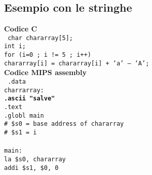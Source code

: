 \documentclass[../main.tex]{subfiles}
\begin{document}
\subsection*{Esempio con le stringhe}
\textbf{Codice C} \\
\texttt{
    char chararray[5]; \\
    int i; \\
    for (i=0 ; i != 5 ; i++) \\
    \hspace*{0cm} \hspace*{0cm} \hspace*{0cm} \hspace*{0cm} chararray[i] = chararray[i] + ‘a’ – ‘A’; \\[3mm]
}
\textbf{Codice MIPS assembly} \\
\texttt{
    .data \\
    charrarray: \\
    \hspace*{0cm} \hspace*{0cm} \hspace*{0cm} \hspace*{0cm} \textbf{.ascii "salve"} \\
    \hspace*{0cm} \hspace*{0cm} \hspace*{0cm} \hspace*{0cm} .text \\
    \hspace*{0cm} \hspace*{0cm} \hspace*{0cm} \hspace*{0cm} .globl main \\
    \# \$s0 = base address of chararray \\
    \# \$s1 = i \\
    \\
    main: \\
    \hspace*{0cm} \hspace*{0cm} \hspace*{0cm} \hspace*{0cm} \hspace*{0cm} \hspace*{0cm} \hspace*{0cm} la \$s0, chararray \\
    \hspace*{0cm} \hspace*{0cm} \hspace*{0cm} \hspace*{0cm} \hspace*{0cm} \hspace*{0cm} \hspace*{0cm} addi \$s1, \$0, 0 \\
}
\end{document}
